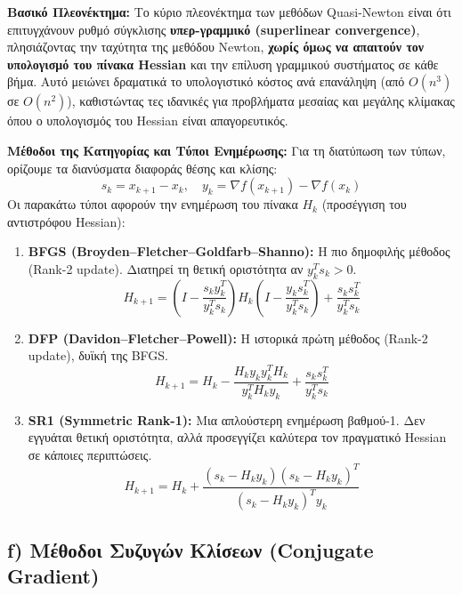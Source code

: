 \documentclass[a4paper,12pt]{article}
\begin{document}
\textbf{Βασικό Πλεονέκτημα:}
Το κύριο πλεονέκτημα των μεθόδων Quasi-Newton είναι ότι επιτυγχάνουν ρυθμό σύγκλισης \textbf{υπερ-γραμμικό (superlinear convergence)}, πλησιάζοντας την ταχύτητα της μεθόδου Newton, \textbf{χωρίς όμως να απαιτούν τον υπολογισμό του πίνακα Hessian} και την επίλυση γραμμικού συστήματος σε κάθε βήμα.
Αυτό μειώνει δραματικά το υπολογιστικό κόστος ανά επανάληψη (από $O(n^3)$ σε $O(n^2)$), καθιστώντας τες ιδανικές για προβλήματα μεσαίας και μεγάλης κλίμακας όπου ο υπολογισμός του Hessian είναι απαγορευτικός.

\textbf{Μέθοδοι της Κατηγορίας και Τύποι Ενημέρωσης:}
Για τη διατύπωση των τύπων, ορίζουμε τα διανύσματα διαφοράς θέσης και κλίσης:
$$ s_k = x_{k+1} - x_k, \quad y_k = \nabla f(x_{k+1}) - \nabla f(x_k) $$
Οι παρακάτω τύποι αφορούν την ενημέρωση του πίνακα $H_k$ (προσέγγιση του αντιστρόφου Hessian):

\begin{enumerate}
    \item \textbf{BFGS (Broyden–Fletcher–Goldfarb–Shanno):}
    Η πιο δημοφιλής μέθοδος (Rank-2 update). Διατηρεί τη θετική οριστότητα αν $y_k^T s_k > 0$.
    \begin{equation}
        H_{k+1} = \left(I - \frac{s_k y_k^T}{y_k^T s_k}\right) H_k \left(I - \frac{y_k s_k^T}{y_k^T s_k}\right) + \frac{s_k s_k^T}{y_k^T s_k}
    \end{equation}

    \item \textbf{DFP (Davidon–Fletcher–Powell):}
    Η ιστορικά πρώτη μέθοδος (Rank-2 update), δυϊκή της BFGS.
    \begin{equation}
        H_{k+1} = H_k - \frac{H_k y_k y_k^T H_k}{y_k^T H_k y_k} + \frac{s_k s_k^T}{y_k^T s_k}
    \end{equation}

    \item \textbf{SR1 (Symmetric Rank-1):}
    Μια απλούστερη ενημέρωση βαθμού-1. Δεν εγγυάται θετική οριστότητα, αλλά προσεγγίζει καλύτερα τον πραγματικό Hessian σε κάποιες περιπτώσεις.
    \begin{equation}
        H_{k+1} = H_k + \frac{(s_k - H_k y_k)(s_k - H_k y_k)^T}{(s_k - H_k y_k)^T y_k}
    \end{equation}
\end{enumerate}
\subsection*{f) Μέθοδοι Συζυγών Κλίσεων (Conjugate Gradient)}
\end{document}
